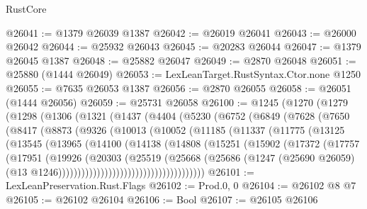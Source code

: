 \begin{lexlean}{RustCore}
\begin{coremodule}
@26041 := @1379 @26039 @1387
@26042 := @26019 @26041
@26043 := @26000 @26042
@26044 := @25932 @26043
@26045 := @20283 @26044
@26047 := @1379 @26045 @1387
@26048 := @25882 @26047
@26049 := @2870 @26048
@26051 := @25880 (@1444 @26049)
@26053 := LexLeanTarget.RustSyntax.Ctor.none @1250
@26055 := @7635 @26053 @1387
@26056 := @2870 @26055
@26058 := @26051 (@1444 @26056)
@26059 := @25731 @26058
@26100 := @1245
    (@1270
      (@1279
        (@1298
          (@1306
            (@1321
              (@1437
                (@4404
                  (@5230
                    (@6752
                      (@6849
                        (@7628
                          (@7650
                            (@8417
                              (@8873
                                (@9326
                                  (@10013
                                    (@10052
                                      (@11185
                                        (@11337
                                          (@11775
                                            (@13125
                                              (@13545
                                                (@13965
                                                  (@14100
                                                    (@14138
                                                      (@14808
                                                        (@15251
                                                          (@15902
                                                            (@17372
                                                              (@17757
                                                                (@17951
                                                                  (@19926
                                                                    (@20303
                                                                      (@25519
                                                                        (@25668
                                                                          (@25686
                                                                            (@1247
                                                                              (@25690 @26059)
                                                                              (@13
                                                                                @1246))))))))))))))))))))))))))))))))))))))
@26101 := LexLeanPreservation.Rust.Flags
@26102 := Prod.{0, 0}
@26104 := @26102 @8 @7
@26105 := @26102 @26104
@26106 := Bool
@26107 := @26105 @26106

\end{coremodule}
\end{lexlean}
